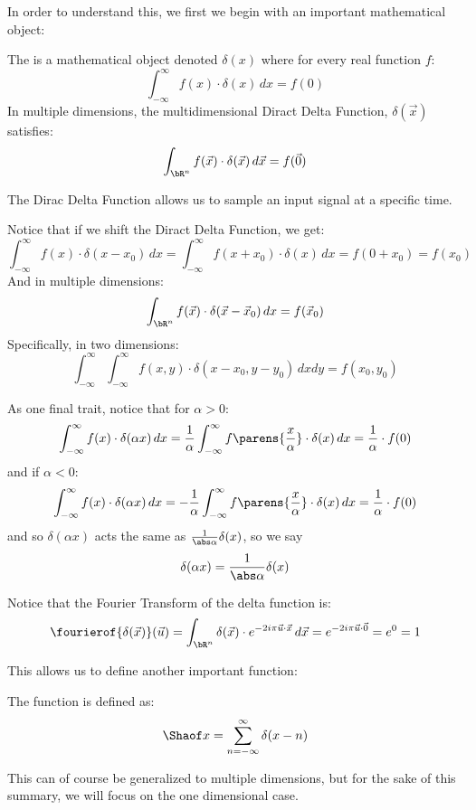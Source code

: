 \documentclass[10pt]{article}
\begin{document}
In order to understand this, we first we begin with an important mathematical object:

\begin{defn*}

    The  is a mathematical object denoted $\delta(x)$ where for every real function $f$:
    \[ \int_{-\infty}^\infty f(x)\cdot\delta(x)\,dx = f(0) \]
    In multiple dimensions, the multidimensional Diract Delta Function, $\delta(\vec x)$ satisfies:
    \[ \int_{\bR^n} f(\vec x)\cdot\delta(\vec x)\,d\vec x = f(\vec 0) \]

\end{defn*}

The Dirac Delta Function allows us to sample an input signal at a specific time.

Notice that if we shift the Diract Delta Function, we get:
\[ \int_{-\infty}^\infty f(x)\cdot\delta(x-x_0)\,dx = \int_{-\infty}^\infty f(x+x_0)\cdot\delta(x)\,dx = f(0+x_0) = f(x_0) \]
And in multiple dimensions:
\[ \int_{\bR^n} f(\vec x)\cdot\delta(\vec x - \vec x_0)\,dx = f(\vec x_0) \]
Specifically, in two dimensions:
\[ \int_{-\infty}^\infty\int_{-\infty}^\infty f(x,y)\cdot\delta(x-x_0, y-y_0)\,dxdy = f(x_0, y_0) \]

As one final trait, notice that for $\alpha>0$:
\[ \int_{-\infty}^\infty f(x)\cdot\delta(\alpha x)\,dx = \frac1\alpha\int_{-\infty}^\infty f\parens{\frac x\alpha}\cdot\delta(x)\,dx = \frac1\alpha\cdot f(0) \]
and if $\alpha<0$:
\[ \int_{-\infty}^\infty f(x)\cdot\delta(\alpha x)\,dx = -\frac1\alpha\int_{-\infty}^\infty f\parens{\frac x\alpha}\cdot\delta(x)\,dx = \frac1\alpha\cdot f(0) \]
and so $\delta(\alpha x)$ acts the same as $\frac1{\abs\alpha}\delta(x)$, so we say
\[ \delta(\alpha x) = \frac1{\abs\alpha}\delta(x) \]

Notice that the Fourier Transform of the delta function is:
\[ \fourierof{\delta(\vec x)}(\vec u) = \int_{\bR^n}\delta(\vec x)\cdot e^{-2i\pi \vec u\cdot\vec x}\,d\vec x = e^{-2i\pi \vec u\cdot\vec0} = e^0 = 1 \]

This allows us to define another important function:

\begin{defn*}

    The  function is defined as:
    \[ \Shaof x = \sum_{n=-\infty}^\infty \delta(x-n) \]

\end{defn*}

This can of course be generalized to multiple dimensions, but for the sake of this summary, we will focus on the one dimensional case.
\end{document}
